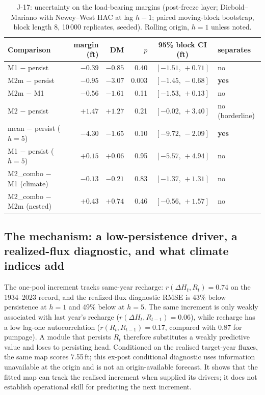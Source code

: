 \documentclass[preprint,11pt,authoryear]{elsarticle}
\theoremstyle{definition}
\theoremstyle{remark}
\begin{document}
\begin{table}[!htb]
\centering\small
\caption{J-17: uncertainty on the load-bearing margins (post-freeze layer; Diebold--Mariano with Newey--West HAC at lag $h-1$; paired moving-block bootstrap, block length 8, 10\,000 replicates, seeded). Rolling origin, $h=1$ unless noted.}
\label{tab:edwdm}
\scriptsize\setlength{\tabcolsep}{3pt}
\begin{tabular}{@{}lrrrcl@{}}
\toprule
Comparison & margin (ft) & DM & $p$ & 95\% block CI (ft) & separates \\
\midrule
M1 $-$ persist & $-0.39$ & $-0.85$ & 0.40 & $[-1.51,\,+0.71]$ & no \\
M2m $-$ persist & $-0.95$ & $-3.07$ & 0.003 & $[-1.45,\,-0.68]$ & \textbf{yes} \\
M2m $-$ M1 & $-0.56$ & $-1.61$ & 0.11 & $[-1.53,\,+0.13]$ & no \\
M2 $-$ persist & $+1.47$ & $+1.27$ & 0.21 & $[-0.02,\,+3.40]$ & no (borderline) \\
mean $-$ persist ($h=5$) & $-4.30$ & $-1.65$ & 0.10 & $[-9.72,\,-2.09]$ & \textbf{yes} \\
M1 $-$ persist ($h=5$) & $+0.15$ & $+0.06$ & 0.95 & $[-5.57,\,+4.94]$ & no \\
M2\_combo $-$ M1 (climate) & $-0.13$ & $-0.21$ & 0.83 & $[-1.37,\,+1.31]$ & no \\
M2\_combo $-$ M2m (nested) & $+0.43$ & $+0.74$ & 0.46 & $[-0.56,\,+1.57]$ & no \\
\bottomrule
\end{tabular}
\end{table}

\FloatBarrier
\subsection{The mechanism: a low-persistence driver, a realized-flux diagnostic, and what climate indices add}\label{sec:edw_mech}

The one-pool increment tracks same-year recharge: $r(\Delta H_t,R_t)=0.74$ on the 1934--2023 record, and the realized-flux diagnostic RMSE is 43\% below persistence at $h=1$ and 49\% below at $h=5$. The same increment is only weakly associated with last year's recharge ($r(\Delta H_t,R_{t-1})=0.06$), while recharge has a low lag-one autocorrelation ($r(R_t,R_{t-1})=0.17$, compared with 0.87 for pumpage). A module that persists $R_t$ therefore substitutes a weakly predictive value and loses to persisting head. Conditioned on the realised target-year fluxes, the same map scores 7.55\,ft; this ex-post conditional diagnostic uses information unavailable at the origin and is not an origin-available forecast. It shows that the fitted map can track the realised increment when supplied its drivers; it does not establish operational skill for predicting the next increment.
\end{document}
